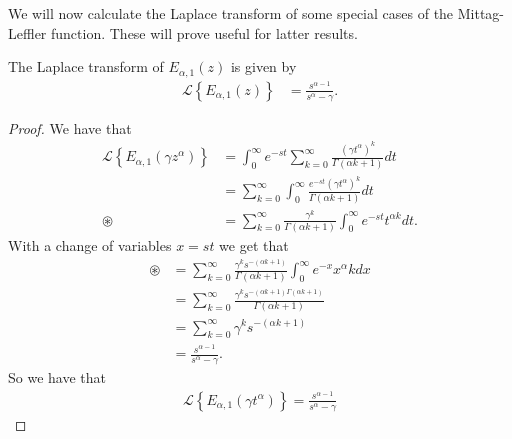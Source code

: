 We will now calculate the Laplace transform of some special cases of the Mittag-Leffler function. These will prove useful for latter results. 
\begin{mdframed}[innertopmargin=10pt]
\begin{lemma}
    \label{lem:lap_mit}
    The Laplace transform of $ E_{\alpha, 1}(z) $ is given by
    \begin{align}
        \mathcal{L} \left\{ E_{\alpha, 1}(z) \right\} &= \frac{s^{\alpha - 1}}{s^\alpha - \gamma}.
    \end{align}
\end{lemma}
\end{mdframed}
\begin{proof}
    We have that
    \begin{align}
        \mathcal{L}\left\{ E_{\alpha, 1}(\gamma z^\alpha)\right\} &= \int_0^\infty e^{-st} \sum_{k=0}^\infty \frac{(\gamma t^\alpha)^k}{\Gamma(\alpha k + 1)} dt \\
        &= \sum_{k=0}^\infty \int_0^\infty \frac{e^{-st} (\gamma t^\alpha)^k}{\Gamma(\alpha k + 1)} dt \\
        \circledast &= \sum_{k=0}^\infty \frac{\gamma^k}{\Gamma(\alpha k + 1)}\int_0^\infty e^{-st}t^{\alpha k} dt.
    \end{align}
    With a change of variables $ x = st $ we get that
    \begin{align}
        \circledast &= \sum_{k=0}^\infty \frac{\gamma^k s^{-(\alpha k+1)}}{\Gamma(\alpha k + 1)} \int_0^\infty e^{-x} x^\alpha kdx \\
        &= \sum_{k=0}^\infty \frac{\gamma^k s^{-(\alpha k + 1)\Gamma(\alpha k + 1)}}{\Gamma(\alpha k + 1)} \\
        &= \sum_{k=0}^\infty \gamma^k s^{-(\alpha k+1)} \\
        &= \frac{s^{\alpha - 1}}{s^\alpha - \gamma}.
    \end{align}
    So we have that
    \begin{align}
        \mathcal{L}\left\{ E_{\alpha,1}( \gamma t^\alpha ) \right\} = \frac{s^{\alpha - 1}}{s^\alpha - \gamma}
    \end{align}
\end{proof}


